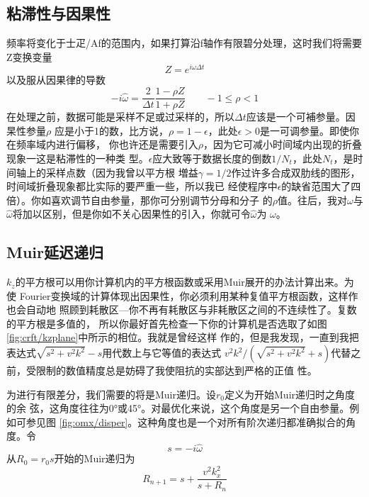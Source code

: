 \subsection{粘滞性与因果性}
\label{sec:4.7.2}


频率将变化于士疋/Af的范围内，如果打算沿f轴作有限碧分处理，这时我们将需要Z变换变量
\begin{equation}
Z=e^{i\omega \Delta t}
\label{eq:ex4.6.2}
\end{equation}
以及服从因果律的导数
\begin{equation}
-i\hat{\omega}=\frac{2}{\Delta t}\frac{1-\rho Z}{1+\rho Z} \quad \quad -1\leq \rho <1
\label{eq:ex4.6.29}
\end{equation}
在处理之前，数据可能是采样不足或过采样的，所以$\Delta t$应该是一个可補参量。因杲性参量$\rho$
应是小于1的数，比方说，$\rho =1-\epsilon$，此处$\epsilon>0$是一可调参量。即使你在频率域内进行偏移，
你也许还是需要引入$\rho$，因为它可减小时间域内出现的折叠现象一这是粘滞性的一种类
型。$\epsilon$应大致等于数据长度的倒数$1/N_t$，此处$N_t$，是时间轴上的采样点数（因为我曾以平方根
増益$\gamma= 1/2$作过许多合成双肋线的图形，时间域折叠现象都比实际的要严重一些，所以我已
经使程序中$\epsilon$的缺省范围大了四倍）。你如喜欢调节自由参量，那你可分别调节分母和分子
的$\rho$值。往后，我对$\omega$与$\hat{\omega}$将加以区别，但是你如不关心因果性的引入，你就可令$\hat{\omega}$为
$\omega$。

\subsection{Muir延迟递归}
\label{sec:4.7.3}

$k_z$的平方根可以用你计算机内的平方根函数或采用Muir展开的办法计算出来。为使
Fourier变换域的计算体现出因果性，你必须利用某种复值平方根函数，这样作也会自动地
照顾到耗散区---你不再有耗散区与非耗散区之间的不连续性了。复数的平方根是多值的，
所以你最好首先检查一下你的计算机是否选取了如图\ref{fig:crft/kzplane}中所示的相位。我就是曾经这样
作的，但是我发现，一直到我把表达式$\sqrt{s^2+v^2k^2}-s$用代数上与它等值的表达式
$v^2k^2/(\sqrt{s^2+v^2k^2}+s)$代替之前，受限制的数值精度总是妨碍了我使阻抗的实部达到严格的正值
性。

为进行有限差分，我们需要的将是Muir递归。设$r_0$定义为开始Muir递归时之角度的余
弦，这角度往往为0°或45°。对最优化来说，这个角度是另一个自由参量。例如可参见图
\ref{fig:omx/disper}。这种角度也是一个对所有阶次递归都准确拟合的角度。令
\begin{equation}
s=-i\hat{\omega}
\label{eq:ex4.6.29}
\end{equation}
从$R_0=r_0s$开始的Muir递归为
\begin{equation}
R_{n+1}=s+\frac{v^2k_x^2}{s+R_n}
\label{eq:4.6.30}
\end{equation}


